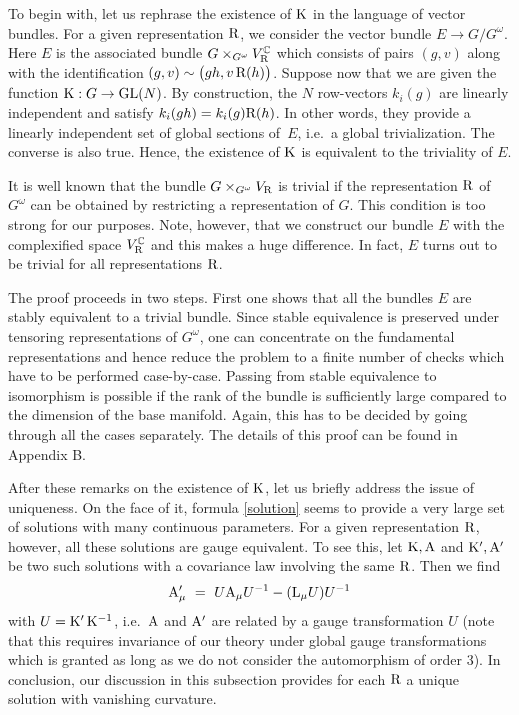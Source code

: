 \documentclass[12pt,a4paper]{article}
\newcommand{\GL}{{\text{GL}}}
\newcommand{\Complex}{\mathbb{C}}
\def\iG{G^\omega} %
\def\tR{{\rm R}} %
\def\tK{{\rm K}} %
\def\tA{{\rm A}}
\def\tL{{\rm L}}
\begin{document}
To begin with, let us rephrase the existence of $\tK$ in the 
language of vector bundles. For a given representation $\tR$, 
we consider the vector bundle $E\to G/\iG$. Here $E$ is the 
associated bundle $G\times_{\iG}V^\Complex_\tR$ which consists 
of pairs $(g,v)$ along with the identification $(g,v)\sim
\bigl(gh,v\,\tR(h)\bigr)$. Suppose now that we are given the 
function $\tK: G\to\GL(N)$. By construction, the $N$ row-vectors 
$k_i(g)$ are linearly independent and satisfy $k_i(gh) =k_i(g)
\tR(h)$. In other words, they provide a linearly independent 
set of global sections of~$E$, i.e.\ a global trivialization. 
The converse is also true. Hence, the existence of $\tK$ is 
equivalent to the triviality of $E$. 
\smallskip

It is well known that the bundle $G \times_{\iG} V_\tR$ is 
trivial if the representation $\tR$ of $\iG$ can 
be obtained by restricting a representation of $G$. This 
condition is too strong for our purposes. Note, 
however, that we construct our bundle $E$ with the 
complexified space $V_\tR^\Complex$ and this makes a huge 
difference. In fact, $E$ turns out to be trivial for all 
representations $\tR$. 
\smallskip

The proof proceeds in two steps. First one shows that all the 
bundles $E$ are stably equivalent to a trivial bundle. Since 
stable equivalence is preserved under tensoring representations
of $\iG$, one can concentrate on the fundamental representations
and hence reduce the problem to a finite number of checks which 
have to be performed case-by-case. Passing from stable equivalence 
to isomorphism is possible if the rank of the bundle is sufficiently 
large compared to the dimension of the base manifold. Again, this 
has to be decided by going through all the cases separately. The 
details of this proof can be found in Appendix B.   
\smallskip 

After these remarks on the existence of $\tK$, let us briefly address 
the issue of uniqueness. On the face of it, formula \eqref{solution} 
seems to provide a very large 
set of solutions with many continuous parameters. For a given 
representation $\tR $, however, all these solutions are gauge 
equivalent. To see this, let $\tK ,\tA $ and $\tK',\tA'$ be 
two such solutions with a covariance law involving the same $\tR$.  
Then we find 
\begin{equation}
\tA_{\mu}'\ =\ U\tA_{\mu }U^{-1} - (\tL _{\mu }U)U^{-1}
\end{equation}
with $U=\tK'\,\tK^{-1}$, i.e.\ $\tA $ and $\tA'$ are related by a 
gauge transformation $U$ (note that this requires invariance of our
theory under global gauge transformations which is granted as long
as we do not consider the automorphism of order $3$).
In conclusion, our discussion in this 
subsection provides for each $\tR$ a unique solution with vanishing
curvature.
\medskip
\end{document}

